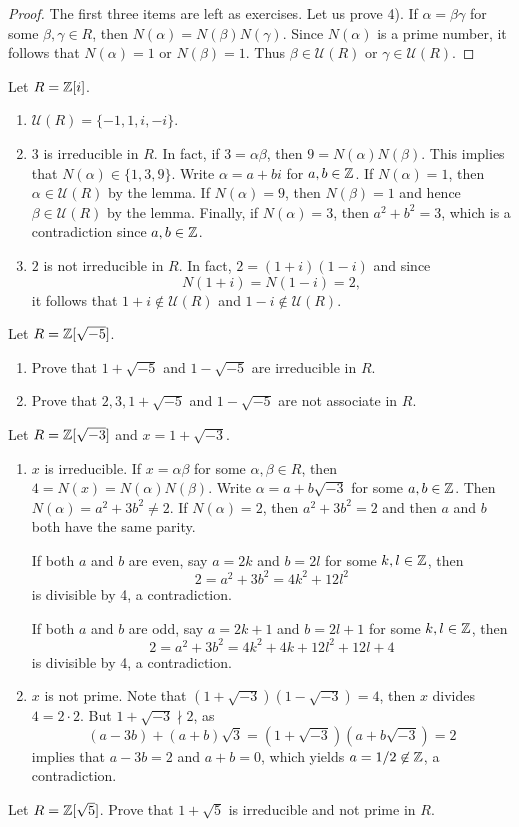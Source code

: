 \begin{proof}
	The first three items are left as exercises. Let us prove 4). 
	If $\alpha=\beta\gamma$ for some $\beta,\gamma\in R$, then
	$N(\alpha)=N(\beta)N(\gamma)$. Since $N(\alpha)$ is a prime number, it follows that
	$N(\alpha)=1$ or $N(\beta)=1$. Thus $\beta\in\mathcal{U}(R)$ or $\gamma\in\mathcal{U}(R)$. 	
\end{proof}

\begin{example}
	Let $R=\mathbb{Z}[i]$. 
	\begin{enumerate}
		\item $\mathcal{U}(R)=\{-1,1,i,-i\}$.
		\item $3$ is irreducible in $R$. In fact, if $3=\alpha\beta$, then
			$9=N(\alpha)N(\beta)$. This implies that $N(\alpha)\in\{1,3,9\}$. Write
			$\alpha=a+bi$ for $a,b\in\mathbb{Z}$. If $N(\alpha)=1$, then $\alpha\in\mathcal{U}(R)$ by the lemma. 
			If $N(\alpha)=9$, then $N(\beta)=1$ and hence $\beta\in\mathcal{U}(R)$ by the lemma. Finally, 
			if $N(\alpha)=3$, then $a^2+b^2=3$, which is a contradiction since $a,b\in\mathbb{Z}$. 
		\item $2$ is not irreducible in $R$. In fact, $2=(1+i)(1-i)$ and
			since \[
			N(1+i)=N(1-i)=2,
			\]
			it follows that $1+i\not\in\mathcal{U}(R)$ 
			and $1-i\not\in\mathcal{U}(R)$. 
	\end{enumerate}	
\end{example}

\begin{exercise}
	Let $R=\mathbb{Z}[\sqrt{-5}]$. 
	\begin{enumerate}
		\item Prove that $1+\sqrt{-5}$ and $1-\sqrt{-5}$ are irreducible in $R$. 
		\item Prove that $2,3,1+\sqrt{-5}$ and $1-\sqrt{-5}$ are not associate in $R$.
	\end{enumerate}
\end{exercise}

\begin{example}
	Let $R=\mathbb{Z}[\sqrt{-3}]$ and $x=1+\sqrt{-3}$. 
	\begin{enumerate}
		\item $x$ is irreducible. 
	If $x=\alpha\beta$ for some $\alpha,\beta\in R$, then 
	$4=N(x)=N(\alpha)N(\beta)$. Write $\alpha=a+b\sqrt{-3}$ for some $a,b\in\mathbb{Z}$. Then
	$N(\alpha)=a^2+3b^2\ne 2$. If $N(\alpha)=2$, then $a^2+3b^2=2$ and then $a$ and $b$
	both have the same parity. 
	
	If both $a$ and $b$ are even, say $a=2k$ and $b=2l$ for
	some $k,l\in\mathbb{Z}$, then 
	\[
	2=a^2+3b^2=4k^2+12l^2
	\]
	is divisible by 4, a contradiction.  
	
	If both $a$ and $b$ are odd, say $a=2k+1$ and $b=2l+1$ for some $k,l\in\mathbb{Z}$, then
	\[
	2=a^2+3b^2=4k^2+4k+12l^2+12l+4
	\]
	is divisible by 4, a contradiction. 
		\item $x$ is not prime. Note that $(1+\sqrt{-3})(1-\sqrt{-3})=4$, then 
		$x$ divides $4=2\cdot 2$. But $1+\sqrt{-3}\nmid 2$, as 
		\[
		(a-3b)+(a+b)\sqrt{3}=(1+\sqrt{-3})(a+b\sqrt{-3})=2
		\]
		implies that $a-3b=2$ and $a+b=0$, which yields 
		$a=1/2\not\in\mathbb{Z}$, a contradiction.
	\end{enumerate}
\end{example}

\begin{exercise}
	Let $R=\mathbb{Z}[\sqrt{5}]$. Prove that $1+\sqrt{5}$ is irreducible and not prime in $R$. 	
\end{exercise}
